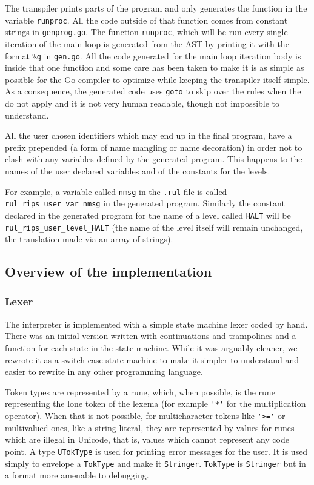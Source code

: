 \documentclass[a4paper]{article}
\begin{document}
The transpiler prints parts of the program and only generates the function
in the variable \verb+runproc+.  All the code outside of that function comes
from constant strings in \texttt{genprog.go}. The function \verb+runproc+,
which will be run every single iteration of the main loop
is generated from the AST by printing it with the format
\verb+%g+ in \texttt{gen.go}. All the code generated for the
main loop iteration body  is inside that
one function and some care has been taken to make it is as simple
as possible for the Go compiler to optimize while keeping the transpiler
itself simple.  As a consequence, the generated code uses \verb+goto+ to skip over the
rules when the do not apply and it is not very human readable, though
not impossible to understand.


All the user chosen identifiers which may end up in the final program,
have a prefix prepended (a form of name mangling or name decoration)
in order not to clash with any variables defined
by the generated program.  This happens to the names of the user declared
variables and of the constants for the levels.

For example, a variable called \verb+nmsg+ in the \texttt{.rul} file
is called \verb+rul_rips_user_var_nmsg+ in the generated program.
Similarly the constant declared in the generated program for the
name of a level called \verb+HALT+ will be
\verb+rul_rips_user_level_HALT+ (the
name of the level itself will remain unchanged, the translation made via
an array of strings).

\subsection{Overview of the implementation}

\subsubsection{Lexer}
The interpreter is implemented with a simple state machine lexer coded by
hand. There was an initial version
written with continuations and trampolines and
a function for each state in the state machine. While
it was arguably cleaner, we rewrote it as a switch-case state machine
to make it simpler to understand
and easier to rewrite in any other programming language.

Token types are represented by a rune, which, when possible, is the
rune representing the lone token of the lexema (for example \verb+'*'+
for the multiplication operator). When that is not possible, for multicharacter
tokens like \verb+'>='+ or multivalued ones, like a string literal, they are
represented by values for runes which are illegal in Unicode, that is,
values which cannot represent any code point.  A type \verb+UTokType+
is used for printing error messages for the user. It is used simply to
envelope a \verb+TokType+ and make it \verb+Stringer+. \verb+TokType+
is \verb+Stringer+ but in a format more amenable to debugging.
\end{document}
